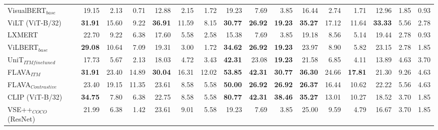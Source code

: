 \documentclass[10pt,twocolumn,letterpaper]{article}
\begin{document}
\begin{table*}[!ht]
{\begin{tabular}{lrrr|rrr|rrr|rrr|rrr}
 VisualBERT$_{base}$          & 19.15          & 2.13           & 0.71           & 12.88          & 2.15           & 1.72           & 19.23          & 7.69           & 3.85           & 16.44          & 2.74           & 1.71           & 12.96          & 1.85           & 0.93           \\
 ViLT (ViT-B/32)              & \textbf{31.91} & 15.60          & 9.22           & \textbf{36.91} & 11.59          & 8.15           & \textbf{30.77} & \textbf{26.92} & \textbf{19.23} & \textbf{35.27} & 17.12          & 11.64          & \textbf{33.33} & 5.56           & 2.78           \\
 LXMERT                       & 22.70          & 9.22           & 6.38           & 17.60          & 5.58           & 2.58           & 15.38          & 7.69           & 3.85           & 19.18          & 8.56           & 5.14           & 19.44          & 2.78           & 0.93           \\
 ViLBERT$_{base}$             & \textbf{29.08} & 10.64          & 7.09           & 19.31          & 3.00           & 1.72           & \textbf{34.62} & \textbf{26.92} & \textbf{19.23} & 23.97          & 8.90           & 5.82           & 23.15          & 2.78           & 1.85           \\
 UniT$_{ITM finetuned}$       & 17.73          & 5.67           & 2.13           & 18.03          & 4.72           & 3.43           & \textbf{42.31} & 23.08          & \textbf{19.23} & 21.58          & 6.85           & 4.11           & 13.89          & 4.63           & 3.70           \\
  FLAVA$_{ITM}$                & \textbf{31.91} & 23.40 & 14.89 & \textbf{30.04} & 16.31 & 12.02 & \textbf{53.85} & \textbf{42.31} & \textbf{30.77} & \textbf{36.30} & 24.66 & \textbf{17.81} & 21.30          & 9.26 & 4.63 \\
 FLAVA$_{Contrastive}$        & 23.40          & 19.15 & 11.35 & 23.61          &  8.58 &  5.58 & \textbf{50.00} & \textbf{26.92} & \textbf{26.92} & \textbf{26.37} & 16.44 & 10.62          & 22.22          &  5.56 & 4.63 \\
 CLIP (ViT-B/32)              & \textbf{34.75} & 7.80           & 6.38           & 22.75          & 8.58           & 5.58           & \textbf{80.77} & \textbf{42.31} & \textbf{38.46} & \textbf{35.27} & 13.01          & 10.27          & 18.52          & 3.70           & 1.85           \\
 VSE++$_{COCO}$ (ResNet)      & 21.99          & 6.38           & 1.42           & 23.61          & 9.01           & 5.58           & 19.23          & 7.69           & 3.85           & 25.00          & 9.59           & 4.79           & 16.67          & 3.70           & 1.85           \\

\end{tabular}}
\end{table*}
\end{document}
